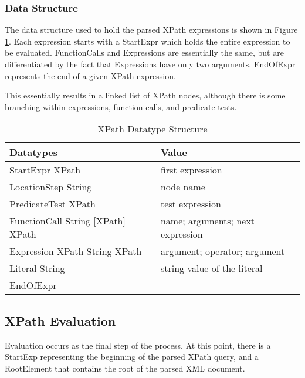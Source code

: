 \documentclass{acm_proc_article-sp}
\begin{document}
\subsubsection{Data Structure}
The data structure used to hold the parsed XPath expressions is shown in Figure \ref{xpathdata}.  Each expression starts with a StartExpr which holds the entire expression to be evaluated.  FunctionCalls and Expressions are essentially the same, but are differentiated by the fact that Expressions have only two arguments.  EndOfExpr represents the end of a given XPath expression.

This essentially results in a linked list of XPath nodes, although there is some branching within expressions, function calls, and predicate tests.

\begin{table}[!htpb]
\caption{XPath Datatype Structure}
\label{xpathdata}
\centering
\begin{tabular*}{.46\textwidth}{|p{} | p{}|}
\hline
\textbf{Datatypes}											&	\textbf{Value} \\
\hline StartExpr XPath									& first expression\\
\hline LocationStep String 							& node name\\
\hline PredicateTest XPath 							& test expression\\
\hline FunctionCall String [XPath] 	XPath & name;  arguments; next expression\\
\hline Expression XPath String XPath			& argument; operator; argument\\
\hline Literal String										& string value of the literal\\
\hline EndOfExpr											&\\
\hline
\end{tabular*}
\end{table}

\subsection{XPath Evaluation}

Evaluation occurs as the final step of the process.  At this point, there is a StartExp representing the beginning of the parsed XPath query, and a RootElement that contains the root of the parsed XML document.
\end{document}
